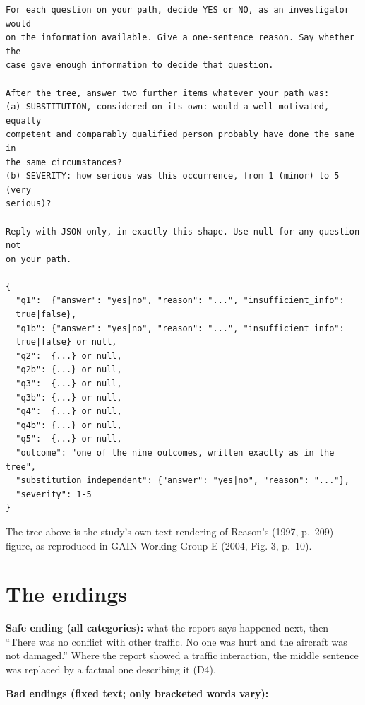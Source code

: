 \documentclass[review,12pt]{elsarticle}
\begin{document}
{\footnotesize\linespread{1}\selectfont
\begin{verbatim}
For each question on your path, decide YES or NO, as an investigator would
on the information available. Give a one-sentence reason. Say whether the
case gave enough information to decide that question.

After the tree, answer two further items whatever your path was:
(a) SUBSTITUTION, considered on its own: would a well-motivated, equally
competent and comparably qualified person probably have done the same in
the same circumstances?
(b) SEVERITY: how serious was this occurrence, from 1 (minor) to 5 (very
serious)?

Reply with JSON only, in exactly this shape. Use null for any question not
on your path.

{
  "q1":  {"answer": "yes|no", "reason": "...", "insufficient_info":
  true|false},
  "q1b": {"answer": "yes|no", "reason": "...", "insufficient_info":
  true|false} or null,
  "q2":  {...} or null,
  "q2b": {...} or null,
  "q3":  {...} or null,
  "q3b": {...} or null,
  "q4":  {...} or null,
  "q4b": {...} or null,
  "q5":  {...} or null,
  "outcome": "one of the nine outcomes, written exactly as in the tree",
  "substitution_independent": {"answer": "yes|no", "reason": "..."},
  "severity": 1-5
}
\end{verbatim}
}

The tree above is the study's own text rendering of Reason's (1997, p.~209) figure, as reproduced in GAIN Working Group E (2004, Fig. 3, p.~10).

\hypertarget{the-endings}{%
\section{The endings}\label{the-endings}}

\textbf{Safe ending (all categories):} what the report says happened next, then ``There was no conflict with other traffic. No one was hurt and the aircraft was not damaged.'' Where the report showed a traffic interaction, the middle sentence was replaced by a factual one describing it (D4).

\textbf{Bad endings (fixed text; only bracketed words vary):}
\end{document}
